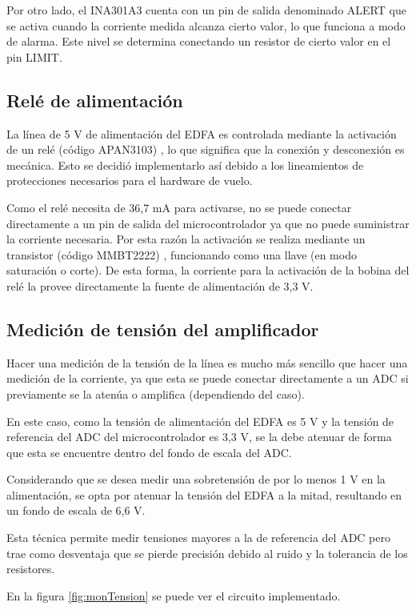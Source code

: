 Por otro lado, el INA301A3 cuenta con un pin de salida denominado ALERT que se activa cuando la corriente medida alcanza cierto valor, lo que funciona a modo de alarma. Este nivel se determina conectando un resistor de cierto valor en el pin LIMIT.

\subsection{Relé de alimentación}

La línea de 5 V de alimentación del EDFA es controlada mediante la activación de un relé (código APAN3103) \citep{WEBSITE:RELE_DS}, lo que significa que la conexión y desconexión es mecánica. Esto se decidió implementarlo así debido a los lineamientos de protecciones necesarios para el hardware de vuelo.

Como el relé necesita de 36,7 mA para activarse, no se puede conectar directamente a un pin de salida del microcontrolador ya que no puede suministrar la corriente necesaria. Por esta razón la activación se realiza mediante un transistor (código MMBT2222) \citep{WEBSITE:TRANS_DS}, funcionando como una llave (en modo saturación o corte). De esta forma, la corriente para la activación de la bobina del relé la provee directamente la fuente de alimentación de 3,3 V.

\subsection{Medición de tensión del amplificador}

Hacer una medición de la tensión de la línea es mucho más sencillo que hacer una medición de la corriente, ya que esta se puede conectar directamente a un ADC si previamente se la atenúa o amplifica (dependiendo del caso).

En este caso, como la tensión de alimentación del EDFA es 5 V y la tensión de referencia del ADC del microcontrolador es 3,3 V, se la debe atenuar de forma que esta se encuentre dentro del fondo de escala del ADC.

Considerando que se desea medir una sobretensión de por lo menos 1 V en la alimentación, se opta por atenuar la tensión del EDFA a la mitad, resultando en un fondo de escala de 6,6 V.

Esta técnica permite medir tensiones mayores a la de referencia del ADC pero trae como desventaja que se pierde precisión debido al ruido y la tolerancia de los resistores.

En la figura \ref{fig:monTension} se puede ver el circuito implementado.

